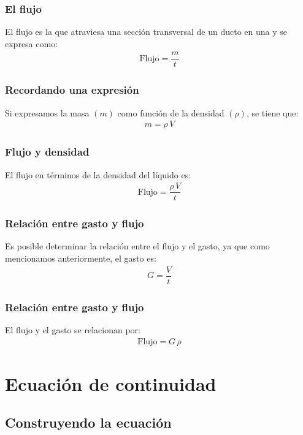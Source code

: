 \documentclass[14pt]{beamer}
\begin{document}
\begin{frame}
\frametitle{El flujo}
El flujo es la  que atraviesa una sección transversal de un ducto en una  y se expresa como:
\pause
\begin{align*}
\text{Flujo} = \dfrac{m}{t}
\end{align*}
\end{frame}
\begin{frame}
\frametitle{Recordando una expresión}
Si expresamos la masa $(m)$ como función de la densidad $(\rho)$, se tiene que:
\pause
\begin{align*}
m = \rho \, V
\end{align*}
\end{frame}
\begin{frame}
\frametitle{Flujo y densidad}
El flujo en términos de la densidad del líquido es:
\pause
\begin{align*}
\text{Flujo} = \dfrac{\rho \, V}{t}
\end{align*}
\end{frame}
\begin{frame}
\frametitle{Relación entre gasto y flujo}
Es posible determinar la relación entre el flujo y el gasto, ya que como mencionamos anteriormente, el gasto es:
\pause
\begin{align*}
G = \dfrac{V}{t}
\end{align*}
\end{frame}
\begin{frame}
\frametitle{Relación entre gasto y flujo}
El flujo y el gasto se relacionan por:
\pause
\begin{align*}
\text{Flujo} = G \, \rho
\end{align*}
\end{frame}

\section{Ecuación de continuidad}
\subsection{Construyendo la ecuación}
\end{document}
